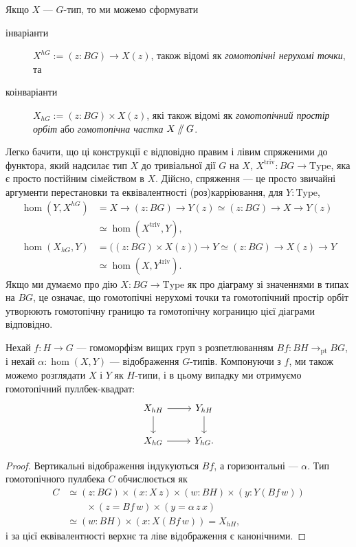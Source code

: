 \documentclass[12pt]{article}
\newcommand*{\pt}{{\mathrm{pt}}}
\newcommand*{\dblslash}{\mathbin{/\kern-3pt/}}
\renewcommand*{\equiv}{\mathrel{\simeq}}
\newcommand*{\Type}{\mathrm{Type}}
\begin{document}
Якщо $X$ — $G$-тип, то ми можемо сформувати
\begin{description}
\item[інваріанти] $X^{hG} := (z : BG) \to X(z)$, також відомі як \emph{гомотопічні нерухомі точки}, та
\item[коінваріанти] $X_{hG} := (z : BG) \times X(z)$, які також відомі як \emph{гомотопічний простір орбіт} або \emph{гомотопічна частка} $X \dblslash G$.
\end{description}
Легко бачити, що ці конструкції є відповідно правим і лівим спряженими до функтора, який надсилає тип $X$ до тривіальної дії $G$ на $X$, $X^{\mathrm{triv}} : BG \to \Type$, яка є просто постійним сімейством в $X$. Дійсно, спряження — це просто звичайні аргументи перестановки та еквівалентності (роз)карріювання, для $Y : \Type$,
\begin{align*}
  \hom(Y, X^{hG})
  &= X \to (z : BG) \to Y(z)
    \equiv (z : BG) \to X \to Y(z) \\
  &\equiv \hom(X^{\mathrm{triv}}, Y), \\
  \hom(X_{hG}, Y)
  &= \big((z : BG) \times X(z)\bigr) \to Y
    \equiv (z : BG) \to X(z) \to Y \\
  &\equiv \hom(X, Y^{\mathrm{triv}}).
\end{align*}
Якщо ми думаємо про дію $X : BG \to \Type$ як про діаграму зі значеннями в типах на $BG$, це означає, що гомотопічні нерухомі точки та гомотопічний простір орбіт утворюють гомотопічну границю та гомотопічну кограницю цієї діаграми відповідно.

\begin{proposition}
  \label{prop:action-hom-pullback}
  Нехай $f : H \to G$ — гомоморфізм вищих груп з розпетлюванням $Bf : BH \to_\pt BG$, і нехай $\alpha : \hom(X,Y)$ — відображення $G$-типів. Компонуючи з $f$, ми також можемо розглядати $X$ і $Y$ як $H$-типи, і в цьому випадку ми отримуємо гомотопічний пуллбек-квадрат:
  \[
    \begin{tikzcd}
      X_{hH} \ar[r]\ar[d] & Y_{hH}\ar[d] \\
      X_{hG} \ar[r]       & Y_{hG}.
    \end{tikzcd}
  \]
\end{proposition}

\begin{proof}
  Вертикальні відображення індукуються $Bf$, а горизонтальні — $\alpha$. Тип гомотопічного пуллбека $C$ обчислюється як
  \begin{align*}
    C
    &\equiv (z : BG) \times (x : X\,z)
      \times (w : BH) \times (y : Y(Bf\,w)) \\
    &\qquad \times (z = Bf\,w) \times (y = \alpha\,z\,x) \\
    &\equiv (w : BH) \times (x : X(Bf\,w))
      = X_{hH},
  \end{align*}
  і за цієї еквівалентності верхнє та ліве відображення є канонічними.
\end{proof}
\end{document}
